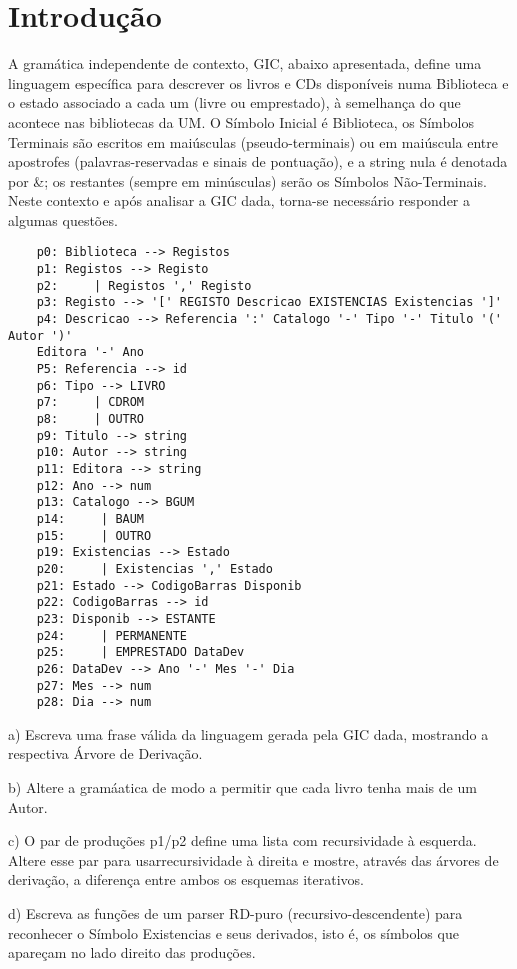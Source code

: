 \section{Introdução}

A gramática independente de contexto, GIC, abaixo apresentada, define uma linguagem específica para descrever os livros e CDs disponíveis numa Biblioteca e o estado associado a cada um (livre ou emprestado), à semelhança do que acontece nas bibliotecas da UM.
O Símbolo Inicial é Biblioteca, os Símbolos Terminais são escritos em maiúsculas (pseudo-terminais) ou em maiúscula entre apostrofes (palavras-reservadas e sinais de pontuação), e a string nula é denotada por \&; os restantes (sempre em minúsculas) serão os Símbolos Não-Terminais.
Neste contexto e após analisar a GIC dada, torna-se necessário responder a algumas questões.
\begin{verbatim}
    p0: Biblioteca --> Registos
    p1: Registos --> Registo
    p2:     | Registos ',' Registo
    p3: Registo --> '[' REGISTO Descricao EXISTENCIAS Existencias ']'
    p4: Descricao --> Referencia ':' Catalogo '-' Tipo '-' Titulo '(' Autor ')'
    Editora '-' Ano
    P5: Referencia --> id
    p6: Tipo --> LIVRO
    p7:     | CDROM
    p8:     | OUTRO
    p9: Titulo --> string
    p10: Autor --> string
    p11: Editora --> string
    p12: Ano --> num
    p13: Catalogo --> BGUM
    p14:     | BAUM
    p15:     | OUTRO
    p19: Existencias --> Estado
    p20:     | Existencias ',' Estado
    p21: Estado --> CodigoBarras Disponib
    p22: CodigoBarras --> id
    p23: Disponib --> ESTANTE
    p24:     | PERMANENTE
    p25:     | EMPRESTADO DataDev
    p26: DataDev --> Ano '-' Mes '-' Dia
    p27: Mes --> num
    p28: Dia --> num

\end{verbatim}


a) Escreva uma frase válida da linguagem gerada pela GIC dada, mostrando a respectiva Árvore de Derivação.

b) Altere a gramáatica de modo a permitir que cada livro tenha mais de um Autor.

c) O par de produções p1/p2 define uma lista com recursividade à esquerda. Altere esse par para usarrecursividade à direita e mostre, através das árvores de derivação, a diferença entre ambos os esquemas iterativos.

d) Escreva as funções de um parser RD-puro (recursivo-descendente) para reconhecer o Símbolo Existencias e seus derivados, isto é, os símbolos que apareçam no lado direito das produções.

